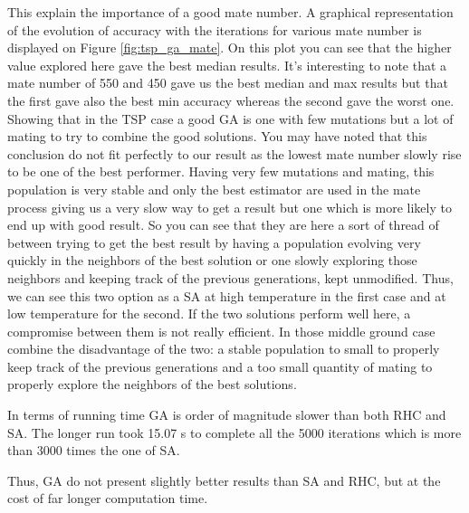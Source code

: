 \documentclass[twocolumn,a4paper,10pt]{article}
\begin{document}
This explain the importance of a good mate number. A graphical representation
of the evolution of accuracy with the iterations for various mate
number is displayed on Figure \ref{fig:tsp_ga_mate}. On this plot
you can see that the higher value explored here gave the best median
results. It's interesting to note that a mate number of 550 and 450
gave us the best median and max results but that the first gave also
the best min accuracy whereas the second gave the worst one. Showing
that in the TSP case a good GA is one with few mutations but a lot
of mating to try to combine the good solutions. You may have noted
that this conclusion do not fit perfectly to our result as the lowest
mate number slowly rise to be one of the best performer. Having very
few mutations and mating, this population is very stable and only
the best estimator are used in the mate process giving us a very slow
way to get a result but one which is more likely to end up with good
result. So you can see that they are here a sort of thread of between
trying to get the best result by having a population evolving very
quickly in the neighbors of the best solution or one slowly exploring
those neighbors and keeping track of the previous generations, kept
unmodified. Thus, we can see this two option as a SA at high temperature
in the first case and at low temperature for the second. If the two
solutions perform well here, a compromise between them is not really
efficient. In those middle ground case combine the disadvantage of
the two: a stable population to small to properly keep track of the
previous generations and a too small quantity of mating to properly
explore the neighbors of the best solutions.

In terms of running time GA is order of magnitude slower than both
RHC and SA. The longer run took 15.07 s to complete all the 5000 iterations
which is more than 3000 times the one of SA.

Thus, GA do not present slightly better results than SA and RHC, but
at the cost of far longer computation time.
\end{document}
